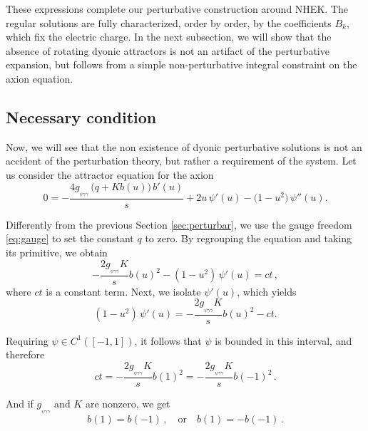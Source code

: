 \documentclass[11pt]{article}
\numberwithin{equation}{section} %
\begin{document}
 These expressions complete our perturbative construction around NHEK. 
The regular solutions are fully characterized, order by order, by the coefficients $B_k$, 
which fix the electric charge. In the next subsection, we will show that the absence of rotating dyonic attractors is not an artifact of the perturbative expansion, but follows from a simple non-perturbative integral constraint on the axion equation.





\subsection{Necessary condition}

Now, we will see that the non existence of dyonic perturbative solutions is not an accident of the perturbation theory, but rather a requirement of the system. Let us consider the attractor equation for the axion
%
\begin{equation}
0=-\frac{4 g_{_{\psi\gamma\gamma}} \,\big(q + K b(u)\big)\, b'(u)}{s}
+ 2u\,\psi'(u)
- \big(1 - u^2\big)\,\psi''(u).
\end{equation}

Differently from the previous Section \ref{sec:perturbar}, we use the gauge freedom \eqref{eq:gauge} to set the constant $q$ to zero. By regrouping the equation and taking its primitive, we obtain
%
\begin{equation}
- \frac{2 g_{_{\psi\gamma\gamma}} K}{s} b(u)^2
- (1 - u^2)\,\psi'(u)
= ct\,,
\end{equation}
%
where $ct$ is a constant term. Next, we isolate $\psi'(u)$, which yields
\begin{equation}
(1 - u^2)\,\psi'(u) 
= - \frac{2 g_{_{\psi\gamma\gamma}} K}{s} b(u)^2 - ct.
\end{equation}

Requiring $\psi \in C^1([-1,1])$, it follows that $\psi$ is bounded in this interval, and therefore
\begin{equation}
ct = - \frac{2 g_{_{\psi\gamma\gamma}} K}{s} b(1)^2 
= - \frac{2 g_{_{\psi\gamma\gamma}} K}{s} b(-1)^2\,.
\end{equation}

And if $g_{_{\psi\gamma\gamma}}$ and $K$ are nonzero, we get
\begin{equation}
b(1)
= b(-1)\,, \quad\text{or}\quad b(1)
=- b(-1)\,.
\end{equation}
\end{document}
